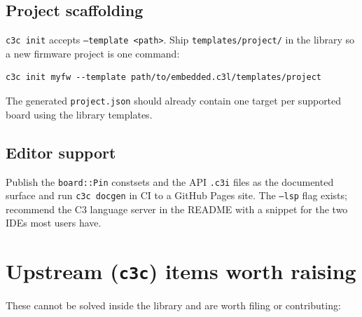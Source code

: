 \documentclass[11pt,a4paper]{article}
\newcommand{\pkg}[1]{\texttt{#1}}
\begin{document}
\subsection{Project scaffolding}

\pkg{c3c init} accepts \pkg{--template <path>}. Ship \pkg{templates/project/} in the library so a
new firmware project is one command:

\begin{lstlisting}
c3c init myfw --template path/to/embedded.c3l/templates/project
\end{lstlisting}
\noindent
The generated
\pkg{project.json} should already contain one target per supported board using the library
templates.

\subsection{Editor support}

Publish the \pkg{board::Pin} constsets and the API \pkg{.c3i} files as the documented surface and
run \pkg{c3c docgen} in CI to a GitHub Pages site. The \pkg{--lsp} flag exists; recommend the C3
language server in the README with a snippet for the two IDEs most users have.

\section{Upstream (\pkg{c3c}) items worth raising}
\label{sec:upstream}

These cannot be solved inside the library and are worth filing or contributing:
\end{document}

